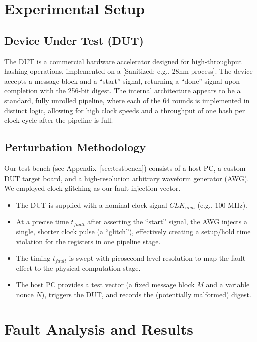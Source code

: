 \documentclass[11pt, a4paper]{article}
\begin{document}
\section{Experimental Setup}
\subsection{Device Under Test (DUT)}
The DUT is a commercial hardware accelerator designed for high-throughput hashing operations, implemented on a [Sanitized: e.g., 28nm process]. The device accepts a message block and a ``start'' signal, returning a ``done'' signal upon completion with the 256-bit digest. The internal architecture appears to be a standard, fully unrolled pipeline, where each of the 64 rounds is implemented in distinct logic, allowing for high clock speeds and a throughput of one hash per clock cycle after the pipeline is full.

\subsection{Perturbation Methodology}
Our test bench (see Appendix~\ref{sec:testbench}) consists of a host PC, a custom DUT target board, and a high-resolution arbitrary waveform generator (AWG). We employed clock glitching as our fault injection vector.
\begin{itemize}
    \item The DUT is supplied with a nominal clock signal $CLK_{nom}$ (e.g., 100 MHz).
    \item At a precise time $t_{fault}$ after asserting the ``start'' signal, the AWG injects a single, shorter clock pulse (a ``glitch''), effectively creating a setup/hold time violation for the registers in one pipeline stage.
    \item The timing $t_{fault}$ is swept with picosecond-level resolution to map the fault effect to the physical computation stage.
    \item The host PC provides a test vector (a fixed message block $M$ and a variable nonce $N$), triggers the DUT, and records the (potentially malformed) digest.
\end{itemize}

\section{Fault Analysis and Results}
\end{document}
